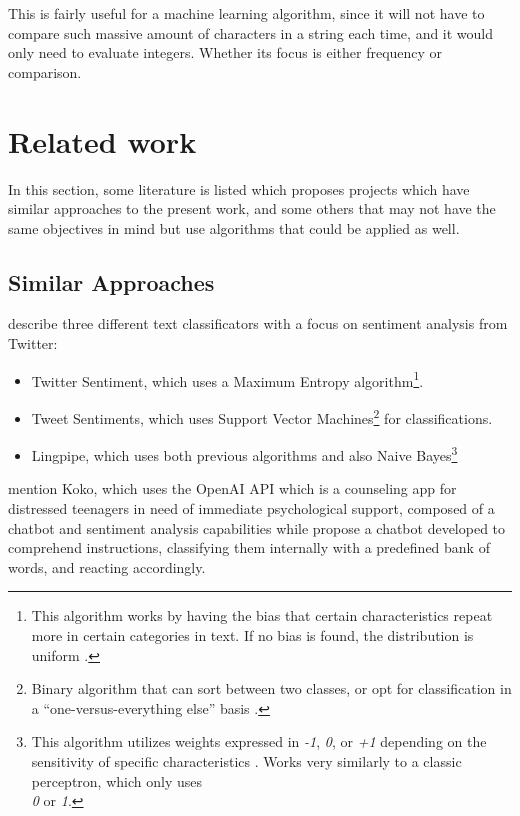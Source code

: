\documentclass[review]{elsarticle} %
\begin{document}
This is fairly useful for a machine learning algorithm, since it will not have to compare such massive amount of characters in a string each time, and it would only need to evaluate integers. Whether its focus is either frequency or comparison.

\section{Related work}
In this section, some literature is listed which proposes projects which have similar approaches to the present work, and some others that may not have the same objectives in mind but use algorithms that could be applied as well.
\subsection{Similar Approaches}
\citet{rf10} describe three different text classificators with a focus on sentiment analysis from Twitter:\\ 
\begin{itemize}
\item Twitter Sentiment, which uses a Maximum Entropy algorithm\footnote{This algorithm works by having the bias that certain characteristics repeat more in certain categories in text. If no bias is found, the distribution is uniform \citep{rf17}.}.
\item Tweet Sentiments, which uses Support Vector Machines\footnote{Binary algorithm that can sort between two classes, or opt for classification in a ``one-versus-everything else'' basis \citep{rf18}.} for classifications.
\item Lingpipe, which uses both previous algorithms and also Naive Bayes\footnote{This algorithm utilizes weights expressed in \textit{-1}, \textit{0}, or \textit{+1} depending on the sensitivity of specific characteristics \citep{rf19}. Works very similarly to a classic perceptron, which only uses\\ \textit{0} or \textit{1}.}
\end{itemize}
\citet{rf6} mention Koko, which uses the OpenAI API which is a counseling app for distressed teenagers in need of immediate psychological support, composed of a chatbot and sentiment analysis capabilities while
\citet{rf14} propose a chatbot developed to comprehend instructions, classifying them internally with a predefined bank of words, and reacting accordingly.
\end{document}
